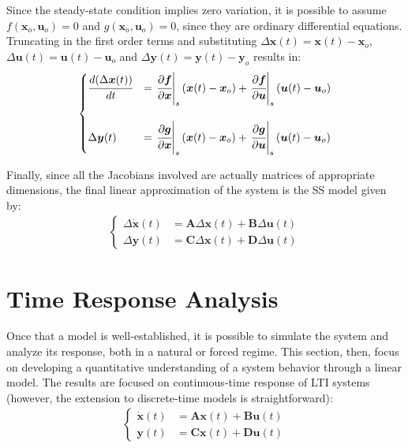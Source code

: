 \documentclass[a4paper,11pt]{book}
\numberwithin{figure}{chapter}
\numberwithin{equation}{chapter}
\numberwithin{table}{chapter}
\theoremstyle{definition}
\begin{document}
Since the steady-state condition implies zero variation, it is possible to assume $f(\bm{x}_o, \bm{u}_o) = 0$ and $g(\bm{x}_o, \bm{u}_o) = 0$, since they are ordinary differential equations. Truncating in the first order terms and substituting $\Delta \bm{x}(t) = \bm{x}(t) - \bm{x}_o$, $\Delta \bm{u}(t) = \bm{u}(t) - \bm{u}_o$ and $\Delta \bm{y}(t) = \bm{y}(t) - \bm{y}_o$ results in:
\begin{align}
\begin{cases}
	\cfrac{d(\Delta \bm{x}(t))}{dt} &=\left. \cfrac{\partial \bm{f}}{\partial \bm{x}}\right\vert_{s} (\bm{x}(t) - \bm{x}_o) + \left. \cfrac{\partial \bm{f}}{\partial \bm{u}}\right\vert_{s}  (\bm{u}(t) - \bm{u}_o) \\ \\
	\Delta \bm{y}(t) &= \left. \cfrac{\partial \bm{g}}{\partial \bm{x}}\right\vert_{s} (\bm{x}(t) - \bm{x}_o) + \left. \cfrac{\partial \bm{g}}{\partial \bm{u}}\right\vert_{s}  (\bm{u}(t) - \bm{u}_o) \\
\end{cases}
\end{align}

Finally, since all the Jacobians involved are actually matrices of appropriate dimensions, the final linear approximation of the system is the SS model given by:
\begin{align}
\begin{cases}
	\Delta \bm{\dot{x}}(t) &= \bm{A}\Delta \bm{x}(t) + \bm{B}\Delta \bm{u}(t) \\
	\Delta \bm{y}(t) &= \bm{C}\Delta \bm{x}(t) + \bm{D}\Delta \bm{u}(t)
\end{cases}
\end{align}

\section{Time Response Analysis}

Once that a model is well-established, it is possible to simulate the system and analyze its response, both in a natural or forced regime. This section, then, focus on developing a quantitative understanding of a system behavior through a linear model. The results are focused on continuous-time response of LTI systems (however, the extension to discrete-time models is straightforward):
\begin{align}
\begin{cases}
	\bm{\dot{x}}(t) &= \bm{A} \bm{x}(t) + \bm{B} \bm{u}(t) \\
	\bm{y}(t) &= \bm{C} \bm{x}(t) + \bm{D} \bm{u}(t)
\end{cases}
\end{align}
\end{document}
